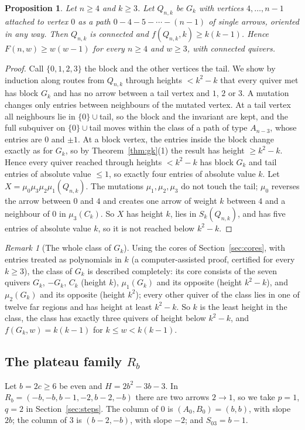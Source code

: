 \documentclass[11pt]{amsart}
\newtheorem{proposition}[theorem]{Proposition}
\theoremstyle{definition}
\theoremstyle{remark}
\newtheorem{remark}[theorem]{Remark}
\begin{document}
\begin{proposition}\label{prop:gkn}
Let $n\ge4$ and $k\ge3$. Let $Q_{n,k}$ be $G_k$ with vertices $4,\dots,n-1$ attached to vertex $0$ as a path $0-4-5-\cdots-(n-1)$ of single arrows, oriented in any way. Then $Q_{n,k}$ is connected and $f(Q_{n,k},k)\ge k(k-1)$. Hence $F(n,w)\ge w(w-1)$ for every $n\ge4$ and $w\ge3$, with connected quivers.
\end{proposition}
\begin{proof}
Call $\{0,1,2,3\}$ the block and the other vertices the tail. We show by induction along routes from $Q_{n,k}$ through heights $<k^2-k$ that every quiver met has block $G_k$ and has no arrow between a tail vertex and $1$, $2$ or $3$. A mutation changes only entries between neighbours of the mutated vertex. At a tail vertex all neighbours lie in $\{0\}\cup$tail, so the block and the invariant are kept, and the full subquiver on $\{0\}\cup$tail moves within the class of a path of type $A_{n-3}$, whose entries are $0$ and $\pm1$. At a block vertex, the entries inside the block change exactly as for $G_k$, so by Theorem~\ref{thm:gk}(1) the result has height $\ge k^2-k$. Hence every quiver reached through heights $<k^2-k$ has block $G_k$ and tail entries of absolute value $\le1$, so exactly four entries of absolute value $k$. Let $X=\mu_0\mu_3\mu_2\mu_1(Q_{n,k})$. The mutations $\mu_1,\mu_2,\mu_3$ do not touch the tail; $\mu_0$ reverses the arrow between $0$ and $4$ and creates one arrow of weight $k$ between $4$ and a neighbour of $0$ in $\mu_3(C_k)$. So $X$ has height $k$, lies in $S_k(Q_{n,k})$, and has five entries of absolute value $k$, so it is not reached below $k^2-k$.
\end{proof}

\begin{remark}[The whole class of $G_k$]\label{rem:gkclass}
Using the cores of Section~\ref{sec:cores}, with entries treated as polynomials in $k$ (a computer-assisted proof, certified for every $k\ge3$), the class of $G_k$ is described completely: its core consists of the seven quivers $G_k$, $-G_k$, $C_k$ (height $k$), $\mu_1(G_k)$ and its opposite (height $k^2-k$), and $\mu_2(G_k)$ and its opposite (height $k^2$); every other quiver of the class lies in one of twelve far regions and has height at least $k^2-k$. So $k$ is the least height in the class, the class has exactly three quivers of height below $k^2-k$, and $f(G_k,w)=k(k-1)$ for $k\le w<k(k-1)$.
\end{remark}

\subsection{The plateau family \texorpdfstring{$R_b$}{R\_b}}\label{sec:rb}
Let $b=2c\ge6$ be even and $H=2b^2-3b-3$. In $R_b=(-b,-b,b-1,-2,b-2,-b)$ there are two arrows $2\to1$, so we take $p=1$, $q=2$ in Section~\ref{sec:steps}. The column of $0$ is $(A_0,B_0)=(b,b)$, with slope $2b$; the column of $3$ is $(b-2,-b)$, with slope $-2$; and $S_{03}=b-1$.
\end{document}
